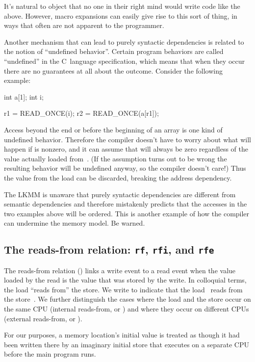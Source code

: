 It's natural to object that no one in their right mind would write
code like the above.
However, macro expansions can easily give rise to this sort of thing,
in ways that often are not apparent to the programmer.

Another mechanism that can lead to purely syntactic dependencies is
related to the notion of ``undefined behavior''.
Certain program behaviors are called ``undefined'' in the C~language
specification, which means that when they occur there are no
guarantees at all about the outcome.
Consider the following example:

\begin{VerbatimU}
	int a[1];
	int i;

	r1 = READ_ONCE(i);
	r2 = READ_ONCE(a[r1]);
\end{VerbatimU}

Access beyond the end or before the beginning of an array is one kind
of undefined behavior.
Therefore the compiler doesn't have to worry about what will happen
if  is nonzero, and it can assume that  will always be
zero regardless of the value actually loaded from~.
(If the assumption turns out to be wrong the resulting behavior will
be undefined anyway, so the compiler doesn't care!)
Thus the value from the load can be discarded, breaking the address
dependency.

The LKMM is unaware that purely syntactic dependencies are different
from semantic dependencies and therefore mistakenly predicts that the
accesses in the two examples above will be ordered.
This is another example of how the compiler can undermine the memory
model.
Be warned.


\subsection{The reads-from relation: \texttt{rf}, \texttt{rfi}, and \texttt{rfe}}
\label{sec:docs:explanation:The Reads-from Relation: rf, rfi, and rfe}

The reads-from relation () links a write event to a read event when
the value loaded by the read is the value that was stored by the
write.
In colloquial terms, the load ``reads from'' the store.
We write  to indicate that the load~ reads from
the store~.
We further distinguish the cases where the load and the store occur on
the same CPU (internal reads-from, or ) and where they occur on
different CPUs (external reads-from, or ).

For our purposes, a memory location's initial value is treated as
though it had been written there by an imaginary initial store that
executes on a separate CPU before the main program runs.

